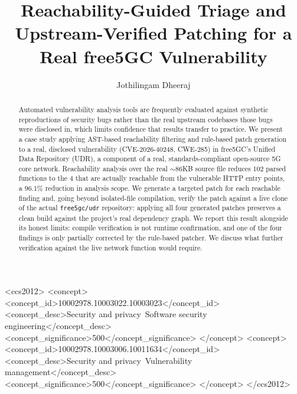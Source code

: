 \documentclass[sigconf]{acmart}
\begin{document}
\title{Reachability-Guided Triage and Upstream-Verified Patching for a Real free5GC Vulnerability}

\author{Jothilingam Dheeraj}

\begin{abstract}
Automated vulnerability analysis tools are frequently evaluated against
synthetic reproductions of security bugs rather than the real upstream
codebases those bugs were disclosed in, which limits confidence that
results transfer to practice. We present a case study applying
AST-based reachability filtering and rule-based patch generation to a
real, disclosed vulnerability (CVE-2026-40248, CWE-285) in free5GC's
Unified Data Repository (UDR), a component of a real, standards-compliant
open-source 5G core network. Reachability analysis over the real
$\sim$86KB source file reduces 102 parsed functions to the 4 that are
actually reachable from the vulnerable HTTP entry points, a 96.1\%
reduction in analysis scope. We generate a targeted patch for each
reachable finding and, going beyond isolated-file compilation, verify
the patch against a live clone of the actual \texttt{free5gc/udr}
repository: applying all four generated patches preserves a clean build
against the project's real dependency graph. We report this result
alongside its honest limits: compile verification is not runtime
confirmation, and one of the four findings is only partially corrected
by the rule-based patcher. We discuss what further verification
against the live network function would require.
\end{abstract}

\begin{CCSXML}
<ccs2012>
<concept>
<concept_id>10002978.10003022.10003023</concept_id>
<concept_desc>Security and privacy~Software security engineering</concept_desc>
<concept_significance>500</concept_significance>
</concept>
<concept>
<concept_id>10002978.10003006.10011634</concept_id>
<concept_desc>Security and privacy~Vulnerability management</concept_desc>
<concept_significance>500</concept_significance>
</concept>
</ccs2012>
\end{CCSXML}


\end{document}

